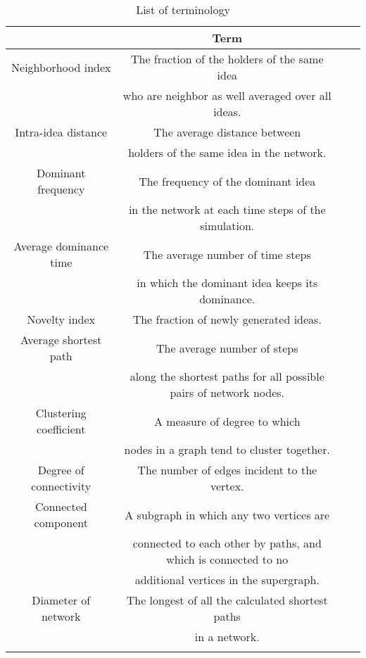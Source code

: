 \begin{table}[ht]
\caption{List of terminology} %
\centering %
\begin{tabular}{c c c c } %
\hline\hline %
 & Term\\ [0.5ex] %
\hline %
Neighborhood index & The fraction of the holders of the same idea\\
\,&  who are neighbor as well averaged over all ideas.\\
\hline
Intra-idea distance& The average distance between \\
&holders of the same idea in the network.\\
\hline
Dominant frequency & The frequency of the dominant idea\\
& in the network at each time steps of the
simulation.\\
\hline
Average dominance time& The average number of time steps \\
&in which the dominant idea keeps its
dominance.\\
\hline
Novelty index& The fraction of newly generated ideas.\\
\hline
Average shortest path & The average number of steps\\
& along the shortest paths for all possible pairs of network nodes.\\
\hline
Clustering coefficient &  A measure of degree to which\\
& nodes in a graph tend to cluster together.\\
\hline
Degree of connectivity &  The number of edges incident to the vertex.\\
\hline
Connected component & A subgraph in which any two vertices are\\
 &connected to each other by paths, and which is connected to no\\
  &additional vertices in the supergraph.\\
\hline
Diameter of network& The longest of all the calculated shortest paths\\
& in a network.\\
\\ [1ex] %
\hline %
\end{tabular}
\label{Tab2} %
\end{table}

